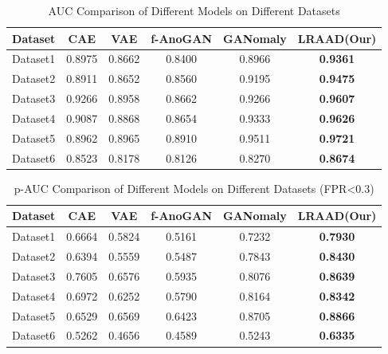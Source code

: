 \documentclass{article}
\begin{document}
\begin{table}[H]
    \centering
    \begin{tabular}{cccccc}
        \toprule
        Dataset & CAE & VAE & f-AnoGAN & GANomaly & LRAAD(Our) \\
        \midrule
        Dataset1 & 0.8975 & 0.8662 & 0.8400 & 0.8966 & \textbf{0.9361} \\
        Dataset2 & 0.8911 & 0.8652 & 0.8560 & 0.9195 & \textbf{0.9475} \\
        Dataset3 & 0.9266 & 0.8958 & 0.8662 & 0.9266 & \textbf{0.9607} \\
        Dataset4 & 0.9087 & 0.8868 & 0.8654 & 0.9333 & \textbf{0.9626} \\
        Dataset5 & 0.8962 & 0.8965 & 0.8910 & 0.9511 & \textbf{0.9721} \\
        Dataset6 & 0.8523 & 0.8178 & 0.8126 & 0.8270 & \textbf{0.8674} \\
        \bottomrule
    \end{tabular}
    \caption{AUC Comparison of Different Models on Different Datasets}
    \label{tab:auc}
\end{table}


\begin{table}[H]
    \centering
    \begin{tabular}{cccccc}
        \toprule
        Dataset & CAE & VAE & f-AnoGAN & GANomaly & LRAAD(Our) \\
        \midrule
        Dataset1 & 0.6664 & 0.5824 & 0.5161 & 0.7232 & \textbf{0.7930} \\
        Dataset2 & 0.6394 & 0.5559 & 0.5487 & 0.7843 & \textbf{0.8430} \\
        Dataset3 & 0.7605 & 0.6576 & 0.5935 & 0.8076 & \textbf{0.8639} \\
        Dataset4 & 0.6972 & 0.6252 & 0.5790 & 0.8164 & \textbf{0.8342} \\
        Dataset5 & 0.6529 & 0.6569 & 0.6423 & 0.8705 & \textbf{0.8866} \\
        Dataset6 & 0.5262 & 0.4656 & 0.4589 & 0.5243 & \textbf{0.6335} \\
        \bottomrule
    \end{tabular}
    \caption{p-AUC Comparison of Different Models on Different Datasets (FPR<0.3)}
    \label{tab:p-auc-03}
\end{table}
\end{document}
